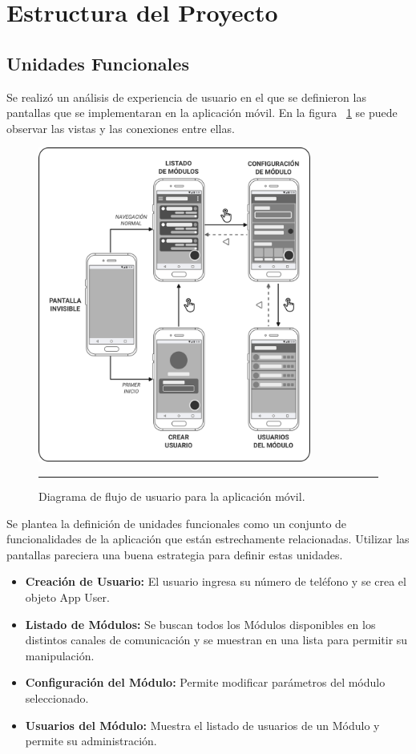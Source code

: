 \section{Estructura del Proyecto}
\subsection{Unidades Funcionales}
Se realizó un análisis de experiencia de usuario en el que se definieron las pantallas que se implementaran en la aplicación móvil. En la figura ~\ref{fig:app_flow} se puede observar las vistas y las conexiones entre ellas.

\begin{figure}[htbp]
	\centering
	\includegraphics[width=0.8\textwidth]{Figures/design/user_flow_ink.png}
	\rule{35em}{1pt}
	\caption[Connection Diagram]{Diagrama de flujo de usuario para la aplicación móvil.}
	\label{fig:app_flow}
\end{figure}

Se plantea la definición de unidades funcionales como un conjunto de funcionalidades de la aplicación que están estrechamente relacionadas.
Utilizar las pantallas pareciera una buena estrategia para definir estas unidades. 

\begin{itemize}
	\item \textbf{Creación de Usuario:} El usuario ingresa su número de teléfono y se crea el objeto App User.
	\item \textbf{Listado de Módulos:} Se buscan todos los Módulos disponibles en los distintos canales de comunicación y se muestran en una lista para permitir su manipulación.
	\item \textbf{Configuración del Módulo:} Permite modificar parámetros del módulo seleccionado.
	\item \textbf{Usuarios del Módulo:} Muestra el listado de usuarios de un Módulo y permite su administración.
\end{itemize}

